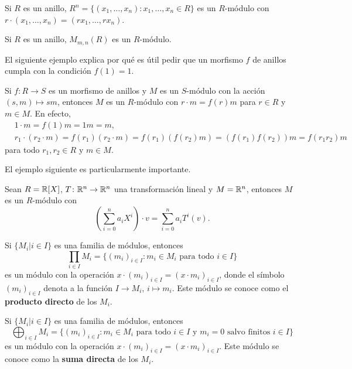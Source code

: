 \begin{example}
Si $R$ es un anillo, $R^n=\{(x_1,\dots,x_n):x_1,\dots,x_n\in R\}$ 
es un $R$-módulo con 
$r\cdot (x_1,\dots,x_n)=(rx_1,\dots,rx_n)$. 
\end{example}

\begin{example}
Si $R$ es un anillo, $M_{m,n}(R)$ es un $R$-módulo.
\end{example}

El siguiente ejemplo explica por qué es útil 
pedir que un morfismo $f$ 
de anillos cumpla con la condición $f(1)=1$. 

\begin{example}
\label{exa:f(1)=1}
Si $f\colon R\to S$ es un morfismo de anillos y $M$ es un $S$-módulo con la acción $(s,m)\mapsto sm$, entonces
$M$ es un $R$-módulo con $r\cdot m=f(r)m$ para $r\in R$ y $m\in M$. En efecto,
\begin{align*}
&1\cdot m=f(1)m=1m=m,\\
&r_1\cdot (r_2\cdot m)=f(r_1)(r_2\cdot m)=f(r_1)(f(r_2)m)=(f(r_1)f(r_2))m=f(r_1r_2)m
\end{align*}
para todo $r_1,r_2\in R$ y $m\in M$.	  	
\end{example}

El ejemplo siguiente es particularmente importante.

\begin{example}
Sean $R=\mathbb{R}[X]$, $T\colon\mathbb{R}^n\to\mathbb{R}^n$ una transformación lineal y $M=\mathbb{R}^n$, entonces $M$ es un $R$-módulo con 
\[
\left(\sum_{i=0}^na_iX^i\right)\cdot v=\sum_{i=0}^na_iT^i(v).
\]	
\end{example}

\begin{example}
Si $\{M_i|i\in I\}$ es una familia de módulos, entonces  	
\[
\prod_{i\in I}M_i=\{(m_i)_{i\in I}:m_i\in M_i\text{ para todo $i\in I$}\}
\]
es un módulo con
la operación 
$x\cdot (m_i)_{i\in I}=(x\cdot m_i)_{i\in I}$, 
donde el símbolo $(m_i)_{i\in I}$ denota a la función $I\to M_i$, $i\mapsto m_i$.
Este módulo se conoce como el \textbf{producto directo} de los $M_i$.
\end{example}

\begin{example}
Si $\{M_i|i\in I\}$ es una familia de módulos, entonces  	
\[
\bigoplus_{i\in I}M_i=\{(m_i)_{i\in I}:m_i\in M_i\text{ para todo $i\in I$ y $m_i=0$ salvo finitos $i\in I$}\}
\]
es un módulo con la operación
$x\cdot (m_i)_{i\in I}=(x\cdot m_i)_{i\in I}$. 
Este módulo se conoce como la \textbf{suma directa} de los $M_i$. 
\end{example}

